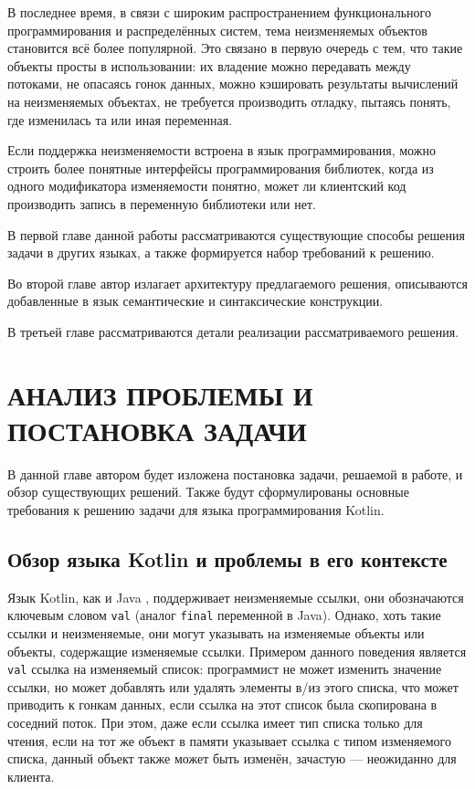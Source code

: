 \documentclass[specification,annotation,times]{itmo-student-thesis}
\begin{document}
В последнее время, в связи с широким распространением функционального программирования и распределённых систем, тема неизменяемых объектов становится всё более популярной.
Это связано в первую очередь с тем, что такие объекты просты в использовании: их
владение можно передавать между потоками, не опасаясь гонок данных, можно кэшировать результаты вычислений на неизменяемых объектах,
не требуется производить отладку, пытаясь понять, где изменилась та или иная переменная.

Если поддержка неизменяемости встроена в язык программирования, можно строить более понятные интерфейсы программирования библиотек,
когда из одного модификатора изменяемости понятно, может ли клиентский код производить запись в переменную библиотеки или нет.

В первой главе данной работы рассматриваются существующие способы решения задачи в других языках, а также формируется набор требований к решению.

Во второй главе автор излагает архитектуру предлагаемого решения, описываются добавленные в язык семантические и синтаксические конструкции.

В третьей главе рассматриваются детали реализации рассматриваемого решения.


\chapter{АНАЛИЗ ПРОБЛЕМЫ И ПОСТАНОВКА ЗАДАЧИ}

В данной главе автором будет изложена постановка задачи, решаемой в работе, и обзор существующих решений.
Также будут сформулированы основные требования к решению задачи для языка программирования Kotlin.

\section{Обзор языка Kotlin и проблемы в его контексте}\label{existing_kotlin}

Язык Kotlin, как и Java \cite{jvm8-spec}, поддерживает неизменяемые ссылки, они обозначаются ключевым словом \texttt{val} (аналог \texttt{final} переменной в Java). 
Однако, хоть такие ссылки и неизменяемые, они могут указывать на изменяемые объекты или объекты, содержащие изменяемые ссылки.
Примером данного поведения является \texttt{val} ссылка на изменяемый список: программист не может изменить значение ссылки, но может добавлять или удалять элементы в/из этого списка, что может приводить к гонкам данных, если ссылка на этот список была скопирована в соседний поток.
При этом, даже если ссылка имеет тип списка только для чтения, если на тот же объект в памяти указывает ссылка с типом изменяемого списка, данный объект также может быть изменён, зачастую --- неожиданно для клиента.
\end{document}

